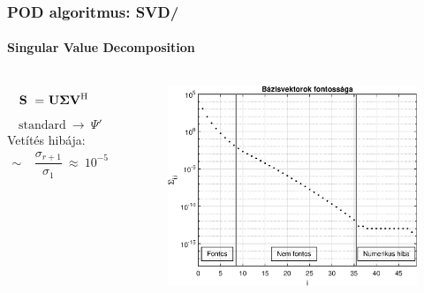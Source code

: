 \documentclass[aspectratio=43]{beamer}
\newcommand\adj[1]{#1^{\mathrm{H}}}
\newcommand{\numframetitle}[1]{\frametitle{#1\hfill\insertframenumber/\insertpresentationendpage\hspace{-\fill}}}
\begin{document}
\begin{frame}
	\numframetitle{POD algoritmus: SVD}
    \framesubtitle{Singular Value Decomposition}
        \begin{columns}
                \Large
                \begin{align*}
                    {\bf S}~=&~{\bf U \Sigma \adj{V}}
                \end{align*}
                \normalsize
                \vspace{0.3cm}
                \begin{align*}
                    \text{standard}~\rightarrow~\Psi'
                \end{align*}
                Vetítés hibája:
                \begin{align*}
                    \sim&~\dfrac{\sigma_{r+1}}{\sigma_1}~\approx~10^{-5}
                \end{align*}
    	        \begin{figure}
			        \includegraphics[width=\textwidth]{kep/euler_0.15_4_sv.eps}
		        \end{figure}
        \end{columns}
\end{frame}
\end{document}
